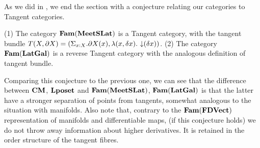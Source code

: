 As we did in , we end the section with a
conjecture relating our categories to Tangent categories.

\begin{conjecture}
  (1) The category $\mathbf{Fam}(\mathbf{MeetSLat})$ is a Tangent category, with the
  tangent bundle
  $T(X, \partial X) = (\Sigma_{x : X}. \partial X(x), \lambda (x,
  \delta x).\, \mathop{\downarrow}(\delta x))$. (2) The category $\mathbf{Fam}(\mathbf{LatGal})$
  is a reverse Tangent category with the analogous definition of
  tangent bundle.
\end{conjecture}

Comparing this conjecture to the previous one, we can see that the
difference between $\mathbf{CM}$, $\mathbf{Lposet}$ and $\mathbf{Fam}(\mathbf{MeetSLat})$,
$\mathbf{Fam}(\mathbf{LatGal})$ is that the latter have a stronger separation of
points from tangents, somewhat analogous to the situation with
manifolds. Also note that, contrary to the $\mathbf{Fam}(\mathbf{FDVect})$
representation of manifolds and differentiable maps, (if this
conjecture holds) we do not throw away information about higher
derivatives. It is retained in the order structure of the tangent
fibres.

